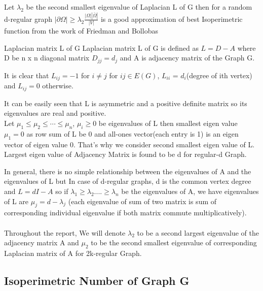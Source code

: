 \documentclass[oneside]{book}
\begin{document}
	Let $\lambda_{2}$ be the second smallest eigenvalue of Laplacian L of G then for a random d-regular graph $|\partial \Omega| \geq \lambda_{2} \frac{|\Omega||\bar{\Omega}|}{|V|}$  is a good approximation of best Isoperimetric function from the work of Friedman and Bollobas  \par 
	
	
	{Laplacian matrix L of G }
	\label{ss:22}
	Laplacian matrix L of G is defined as  $L = D - A$ where  D be n x n diagonal matrix $D_{jj} = d_{j}$ and A is adjacency matrix of the Graph G.\par
	
	
	
	It is clear that   $L_{ij} = -1$ for $i\neq j$  for $ij\in E(G)$,  $L_{ii}$ = $d_i$(degree of ith vertex) and   $L_{ij} = 0$ otherwise.\par
	
	It can be easily seen that L is asymmetric and a positive definite  matrix so its eigenvalues are real and positive. \\
	
	Let $\mu_{1} \leq \mu_{2} \leq \cdots \leq \mu_{n}$, $\mu_{i} \geq 0$  be  eigenvalues of L then smallest eigen value $\mu_{1} = 0$ as row sum of L  be 0 and all-ones vector(each entry is 1) is an eigen vector of eigen value 0. That's why we consider second smallest eigen value of L. Largest eigen value of Adjacency Matrix is found to be d for regular-d Graph. \par
	
	
	
	
	In general, there is no simple relationship between the eigenvalues of
	A and the eigenvalues of L but In case of d-regular graphs, d is the
	common vertex degree and $L = dI - A$  so if $\lambda_{1} \geq \lambda_{2}....\geq \lambda_{n}$  be the eigenvalues of A, we have eigenvalues of L are $\mu_{j} = d - \lambda_{j}$ (each eigenvalue of sum of two matrix is sum of corresponding  individual eigenvalue if both matrix commute multiplicatively). \\\\
	Throughout the report, We will denote $\lambda_{2} $ to be a second largest eigenvalue of the adjacency matrix A and $\mu_{2}$ to be the second smallest eigenvalue of corresponding Laplacian matrix of A for 2k-regular Graph.  
	
	
	
	\subsection{Isoperimetric Number of Graph G} \label{ss:23}
	
\end{document}
